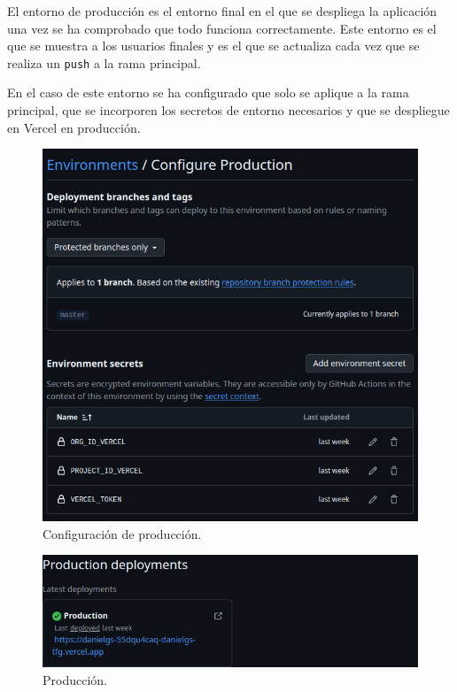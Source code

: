 El entorno de producción es el entorno final en el que se despliega la aplicación una vez se ha comprobado que todo funciona correctamente. Este entorno es el que se muestra a los usuarios finales y es el que se actualiza cada vez que se realiza un \texttt{push} a la rama principal.

En el caso de este entorno se ha configurado que solo se aplique a la rama principal, que se incorporen los secretos de entorno necesarios y que se despliegue en Vercel en producción.

\begin{figure}[H]
    \caption{Configuración de producción.}
    \centering
    \vspace*{0.5cm}
    \includegraphics[scale=0.25]{figuras/entorno_prod.png}
\end{figure}

\begin{figure}[H]
    \caption{Producción.}
    \centering
    \vspace*{0.5cm}
    \includegraphics[scale=0.25]{figuras/despliegue_prod.png}
\end{figure}

